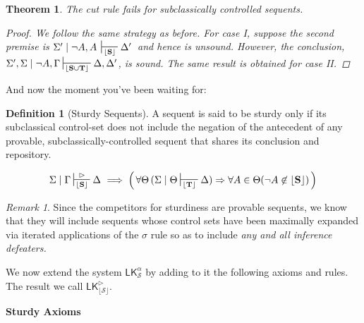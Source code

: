 \documentclass{article}                     %
\theoremstyle{theorem}
\newtheorem{theorem}{Theorem}
\theoremstyle{corollary}
\theoremstyle{lemma}
\theoremstyle{definition}
\newtheorem{definition}[section]{Definition}
\theoremstyle{remark}
\newtheorem{remark}{Remark}
\theoremstyle{definition}
\theoremstyle{notation}
\theoremstyle{definition}
\theoremstyle{proposition}
\theoremstyle{definition}
\begin{document}
\begin{theorem}
The cut rule fails for subclassically controlled sequents.

\begin{proof}
We follow the same strategy as before. For case I, suppose the second premise is $\Sigma'\mid\neg A ,A \,\sststile{\lfloor\mathbf{S}\rfloor}{} \Delta'\,$ and hence is unsound. However, the conclusion, $ \Sigma',\Sigma\mid\neg A,\Gamma\sststile{\lfloor\mathbf{S\cup T}\rfloor}{}\Delta, \Delta'$, is sound. The same result is obtained for case II.
\end{proof}
\end{theorem}

\vspace{3mm}

\begin{framed}
	And now the moment you've been waiting for:
\end{framed}


\begin{definition}[Sturdy Sequents]\label{SturdySeq}
A sequent is said to be sturdy only if its subclassical control-set does not include the negation of the antecedent of any provable, subclassically-controlled sequent that shares its conclusion and repository.

\begin{equation}
\Sigma\mid\Gamma\sststile{\mathbf{\lfloor\mathbf{S}\rfloor}}{\rhd} \Delta \,\,\Longrightarrow\hspace{1mm} 
\Big(\, \forall \Theta\,(\Sigma\mid\Theta\sststile{\mathbf{\lfloor\mathbf{T}\rfloor}}{} \Delta) \Rightarrow \forall A \in \Theta( \neg A \not\in\lfloor\mathbf{S}\rfloor)\,\Big)
\end{equation}
\end{definition}

\begin{remark}
Since the competitors for sturdiness are provable sequents, we know that they will include sequents whose control sets have been maximally expanded via iterated applications of the $ \sigma $ rule so as to include \textit{any and all inference defeaters.} 
\end{remark}

\newpage

We now extend the system $ \mathsf{LK}^\alpha_\mathcal{S} $ by adding to it the following axioms and rules. The result we call $ \mathsf{LK}^\rhd_\mathcal{\lfloor S \rfloor} $.  

\vspace{2mm}
\textbf{Sturdy Axioms}
\vspace{.5cm}
\end{document}

